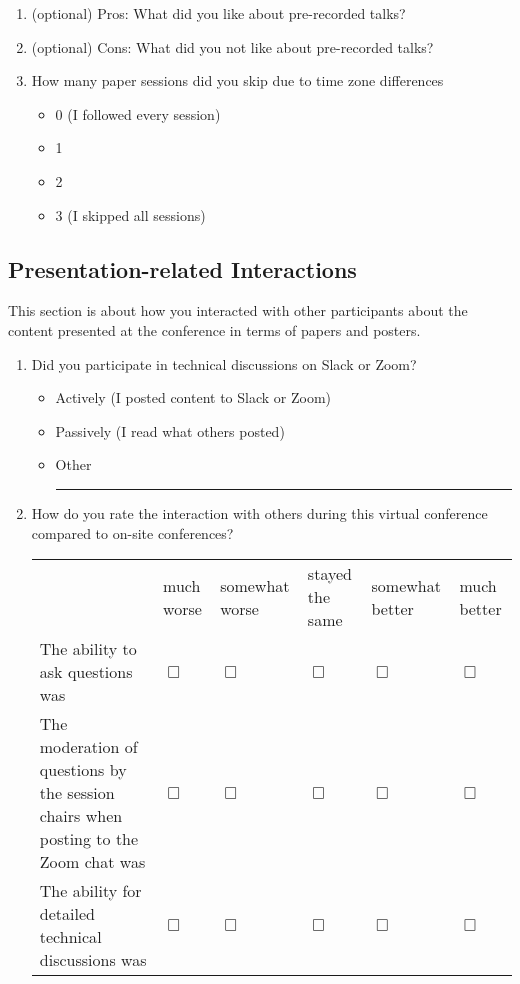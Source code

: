 \documentclass[sigconf]{acmart}
\newcommand{\QO}{$\Box$}%
\newenvironment{Qlist}{%
\renewcommand{\labelitemi}{\QO}
\begin{itemize}[leftmargin=1.5em,topsep=-.5em]
}{%
\end{itemize}
}
\newcommand{\Qline}[1]{\noindent\rule{#1}{0.6pt}}
\newcounter{ql}
\newcommand{\Qlines}[1]{\forloop{ql}{0}{\value{ql}<#1}{\vskip0em\Qline{\linewidth}}}
\begin{document}
\begin{appendix}
\begin{enumerate}
	\item (optional) Pros: What did you like about pre-recorded talks?
		\Qlines{3}

	\item (optional) Cons: What did you not like about pre-recorded talks?
		\Qlines{3}

	\item How many paper sessions did you skip due to time zone differences
		\begin{Qlist}
			\item 0 (I followed every session)
			\item 1
			\item 2
			\item 3 (I skipped all sessions)
		\end{Qlist}

\setcounter{postConfCounter}{\value{enumi}}
\end{enumerate}


\subsection{Presentation-related Interactions}
This section is about how you interacted with other participants about the content presented at the conference in terms of papers and posters.

\begin{enumerate}
\setcounter{enumi}{\value{postConfCounter}}

	\item Did you participate in technical discussions on Slack or Zoom? 
		\begin{Qlist}
			\item Actively (I posted content to Slack or Zoom)
			\item Passively (I read what others posted)
			\item Other \Qline{3cm}
		\end{Qlist}

	\item How do you rate the interaction with others during this virtual conference compared to on-site conferences?
		\begin{tabular}{p{2cm}p{.8cm}p{.8cm}p{.8cm}p{.8cm}p{.8cm}}
			\hline
			& much worse & some\-what worse & stayed the same & some\-what better & much better\\
			The ability to ask questions was & \QO & \QO & \QO & \QO & \QO \\
			\hline
			The moderation of questions by the session chairs when posting to the Zoom chat was & \QO & \QO & \QO & \QO & \QO \\
			\hline
			The ability for detailed technical discussions was &  \QO & \QO & \QO & \QO & \QO \\
		\end{tabular}


\end{enumerate}
\end{appendix}
\end{document}
